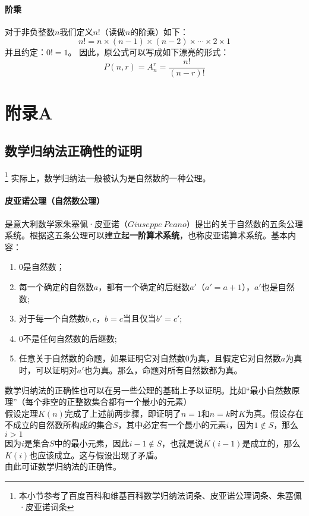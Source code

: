 \documentclass{ctexart}
\begin{document}
    \paragraph{阶乘} 对于非负整数$n$我们定义$n!$（读做$n$的阶乘）如下：
    \[n! = n \times (n-1) \times (n-2) \times \cdots \times 2 \times 1\]
    并且约定：$0! = 1$。
    因此，原公式可以写成如下漂亮的形式：
    \[P(n,r) = A_n^r = \frac{n!}{(n-r)!}\]

   
   
    \section{附录A}
    \subsection{数学归纳法正确性的证明}
    \footnote{本小节参考了百度百科和维基百科数学归纳法词条、皮亚诺公理词条、朱塞佩·皮亚诺词条}
    实际上，数学归纳法一般被认为是自然数的一种公理。
    \paragraph{皮亚诺公理（自然数公理）} 是意大利数学家朱塞佩·皮亚诺（$Giuseppe \ Peano$）提出的关于自然数的五条公理系统。根据这五条公理可以建立起\textbf{一阶算术系统}，也称皮亚诺算术系统。基本内容：
    \begin{enumerate}
        \item 0是自然数；
        \item 每一个确定的自然数$a$，都有一个确定的后继数$a'$（$a' = a+1$），$a'$也是自然数;
        \item 对于每一个自然数$b,c$，$b=c$当且仅当$b' = c'$;
        \item 0不是任何自然数的后继数;
        \item 任意关于自然数的命题，如果证明它对自然数$0$为真，且假定它对自然数$a$为真时，可以证明对$a'$也为真。那么，命题对所有自然数都为真。
    \end{enumerate}
    数学归纳法的正确性也可以在另一些公理的基础上予以证明。比如“最小自然数原理”（每个非空的正整数集合都有一个最小的元素）\\
    假设定理$K(n)$完成了上述前两步骤，即证明了$n = 1$和$n = k$时$K$为真。假设存在不成立的自然数所构成的集合$S$，其中必定有一个最小的元素$i$，因为$1 \notin S$，那么$i > 1$\\
    因为$i$是集合$S$中的最小元素，因此$i - 1 \notin S$，也就是说$K(i -1)$是成立的，那么$K(i)$也应该成立。这与假设出现了矛盾。\\
    由此可证数学归纳法的正确性。
\end{document}
